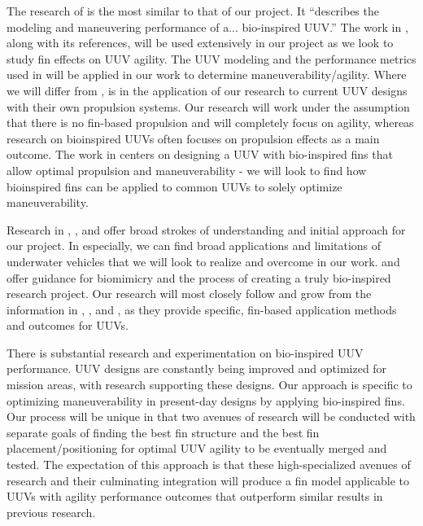 \documentclass{IEEEtran}
\begin{document}
The research of \cite{hiller2012expanding} is the most similar to that of our project. It “describes the modeling and maneuvering performance of a... bio-inspired UUV.” The work in \cite{hiller2012expanding}, along with its references, will be used extensively in our project as we look to study fin effects on UUV agility. The UUV modeling and the performance metrics used in \cite{hiller2012expanding} will be applied in our work to determine maneuverability/agility. Where we will differ from \cite{hiller2012expanding}, is in the application of our research to current UUV designs with their own propulsion systems. Our research will work under the assumption that there is no fin-based propulsion and will completely focus on agility, whereas research on bioinspired UUVs often focuses on propulsion effects as a main outcome. The work in \cite{hiller2012expanding} centers on designing a UUV with bio-inspired fins that allow optimal propulsion and maneuverability - we will look to find how bioinspired fins can be applied to common UUVs to solely optimize maneuverability.

Research in \cite{nrc2005autonomous}, \cite{noaa2009how}, and \cite{maslin2020raising} offer broad strokes of understanding and initial approach for our project. In \cite{nrc2005autonomous} especially, we can find broad applications and limitations of underwater vehicles that we will look to realize and overcome in our work. \cite{noaa2009how} and \cite{maslin2020raising} offer guidance for biomimicry and the process of creating a truly bio-inspired research project. Our research will most closely follow and grow from the information in \cite{berenice2018splash}, \cite{orourke2020navy}, and \cite{hiller2012expanding}, as they provide specific, fin-based application methods and outcomes for UUVs.

There is substantial research and experimentation on bio-inspired UUV performance. UUV designs are constantly being improved and optimized for mission areas, with research supporting these designs. Our approach is specific to optimizing maneuverability in present-day designs by applying bio-inspired fins. Our process will be unique in that two avenues of research will be conducted with separate goals of finding the best fin structure and the best fin placement/positioning for optimal UUV agility to be eventually merged and tested. The expectation of this approach is that these high-specialized avenues of research and their culminating integration will produce a fin model applicable to UUVs with agility performance outcomes that outperform similar results in previous research.
\end{document}
